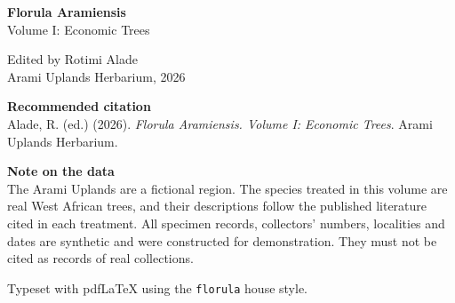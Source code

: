 \thispagestyle{empty}
\vspace*{\fill}
\begin{flushleft}
	\small
	\textbf{Florula Aramiensis}\\
	Volume I: Economic Trees
	
	\medskip
	Edited by Rotimi Alade\\
	Arami Uplands Herbarium, 2026
	
	\medskip
	\textbf{Recommended citation}\\
	Alade, R. (ed.) (2026). \textit{Florula Aramiensis. Volume I: Economic
		Trees}. Arami Uplands Herbarium.
	
	\medskip
	\textbf{Note on the data}\\
	The Arami Uplands are a fictional region. The species treated in this
	volume are real West African trees, and their descriptions follow the
	published literature cited in each treatment. All specimen records,
	collectors' numbers, localities and dates are synthetic and were
	constructed for demonstration. They must not be cited as records of
	real collections.
	
	\medskip
	Typeset with pdf\LaTeX{} using the \texttt{florula} house style.
\end{flushleft}
\cleardoublepage